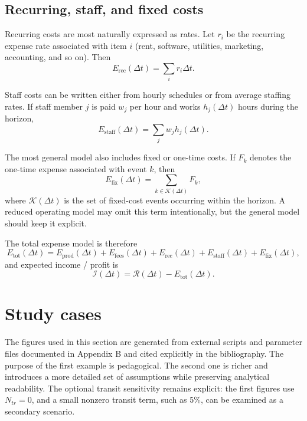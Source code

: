 \documentclass{article}
\begin{document}
\subsection{Recurring, staff, and fixed costs}
\label{sec:costs-fixed}

Recurring costs are most naturally expressed as rates. Let \( r_i \) be the recurring expense rate associated with item \( i \) (rent, software, utilities, marketing, accounting, and so on). Then
\begin{equation}
\label{eq:Erec}
    E_{\mathrm{rec}}(\Delta t) = \sum_i r_i \Delta t.
\end{equation}

Staff costs can be written either from hourly schedules or from average staffing rates. If staff member \( j \) is paid \( w_j \) per hour and works \( h_j(\Delta t) \) hours during the horizon,
\begin{equation}
\label{eq:Estaff}
    E_{\mathrm{staff}}(\Delta t) = \sum_j w_j h_j(\Delta t).
\end{equation}

The most general model also includes fixed or one-time costs. If \( F_k \) denotes the one-time expense associated with event \( k \), then
\begin{equation}
\label{eq:Efix}
    E_{\mathrm{fix}}(\Delta t) = \sum_{k \in \mathcal{K}(\Delta t)} F_k,
\end{equation}
where \( \mathcal{K}(\Delta t) \) is the set of fixed-cost events occurring within the horizon. A reduced operating model may omit this term intentionally, but the general model should keep it explicit.

The total expense model is therefore
\begin{equation}
\label{eq:Etot}
    E_{\mathrm{tot}}(\Delta t) = E_{\mathrm{prod}}(\Delta t) + E_{\mathrm{fees}}(\Delta t) + E_{\mathrm{rec}}(\Delta t) + E_{\mathrm{staff}}(\Delta t) + E_{\mathrm{fix}}(\Delta t),
\end{equation}
and expected income / profit is
\begin{equation}
\label{eq:profit}
    \mathcal{I}(\Delta t) = \mathcal{R}(\Delta t) - E_{\mathrm{tot}}(\Delta t).
\end{equation}

\section{Study cases}
\label{sec:study-case}

The figures used in this section are generated from external scripts and parameter files documented in Appendix B and cited explicitly in the bibliography. The purpose of the first example is pedagogical. The second one is richer and introduces a more detailed set of assumptions while preserving analytical readability. The optional transit sensitivity remains explicit: the first figures use \( N_{tr}=0 \), and a small nonzero transit term, such as 5\%, can be examined as a secondary scenario.
\end{document}
